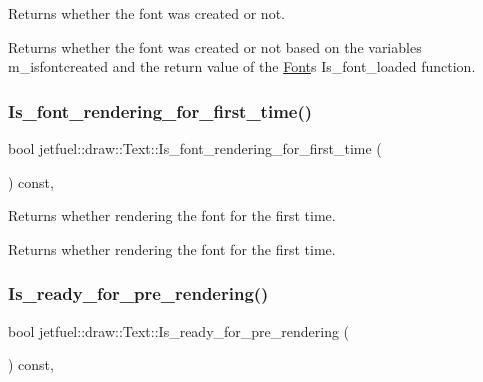 Returns whether the font was created or not. 

Returns whether the font was created or not based on the variables m\+\_\+isfontcreated and the return value of the \hyperlink{classjetfuel_1_1draw_1_1Font}{Font}\textquotesingle{}s Is\+\_\+font\+\_\+loaded function. \mbox{\label{classjetfuel_1_1draw_1_1Text_a007454f20452791fe80f981e45fab1d7}} 
\subsubsection{\texorpdfstring{Is\+\_\+font\+\_\+rendering\+\_\+for\+\_\+first\+\_\+time()}{Is\_font\_rendering\_for\_first\_time()}}
{\footnotesize\ttfamily bool jetfuel\+::draw\+::\+Text\+::\+Is\+\_\+font\+\_\+rendering\+\_\+for\+\_\+first\+\_\+time (\begin{DoxyParamCaption}{ }\end{DoxyParamCaption}) const\hspace{0.3cm}{\ttfamily [inline]}, {\ttfamily [protected]}}



Returns whether rendering the font for the first time. 

Returns whether rendering the font for the first time. \mbox{\label{classjetfuel_1_1draw_1_1Text_a3318092f2bf3d73b08c9e440b3e1e53c}} 
\subsubsection{\texorpdfstring{Is\+\_\+ready\+\_\+for\+\_\+pre\+\_\+rendering()}{Is\_ready\_for\_pre\_rendering()}}
{\footnotesize\ttfamily bool jetfuel\+::draw\+::\+Text\+::\+Is\+\_\+ready\+\_\+for\+\_\+pre\+\_\+rendering (\begin{DoxyParamCaption}{ }\end{DoxyParamCaption}) const\hspace{0.3cm}{\ttfamily [inline]}, {\ttfamily [protected]}}



